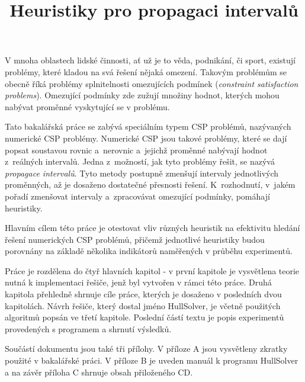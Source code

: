 \documentclass[thesis=B,czech]{FITthesis}[2012/06/26]
\title{Heuristiky pro propagaci intervalů}
\theoremstyle{definition}
\begin{document}

\begin{introduction}
V mnoha oblastech lidské činnosti, ať už je to věda, podnikání, či sport, existují problémy, které kladou na svá řešení nějaká omezení. Takovým problémům se obecně říká problémy splnitelnosti omezujících podmínek (\emph{constraint satisfaction problems}). Omezující podmínky zde zužují množiny hodnot, kterých mohou nabývat proměnné vyskytující se v problému.

Tato bakalářská práce se zabývá speciálním typem CSP problémů, nazývaných numerické CSP problémy. Numerické CSP jsou takové problémy, které se dají popsat soustavou rovnic a~nerovnic a~jejichž proměnné nabývají hodnot z~reálných intervalů. Jedna z~možností, jak tyto problémy řešit, se nazývá \emph{propagace intervalů}. Tyto metody postupně zmenšují intervaly jednotlivých proměnných, až je dosaženo dostatečné přesnosti řešení. K~rozhodnutí, v~jakém pořadí zmenšovat intervaly a~zpracovávat omezující podmínky, pomáhají heuristiky.

Hlavním cílem této práce je otestovat vliv různých heuristik na efektivitu hledání řešení numerických CSP problémů, přičemž jednotlivé heuristiky budou porovnány na základě několika indikátorů naměřených v průběhu experimentů.

Práce je rozdělena do čtyř hlavních kapitol - v první kapitole je vysvětlena teorie nutná k implementaci řešiče, jenž byl vytvořen v rámci této práce. Druhá kapitola přehledně shrnuje cíle práce, kterých je dosaženo v posledních dvou kapitolách. Návrh řešiče, který dostal jméno HullSolver, je včetně použitých algoritmů popsán ve třetí kapitole. Poslední částí textu je popis experimentů provedených s programem a shrnutí výsledků.

Součástí dokumentu jsou také tři přílohy. V příloze A jsou vysvětleny zkratky použité v bakalářské práci. V příloze B je uveden manuál k programu HullSolver a na závěr příloha C shrnuje obsah přiloženého CD.


\end{introduction}





\end{document}
